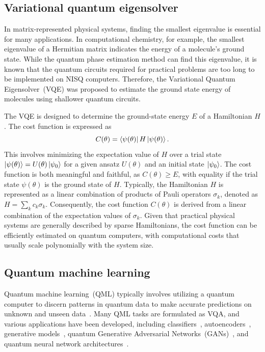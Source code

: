 \documentclass[12pt,dvipdfmx,twoside,openright]{report}
\begin{document}
\subsection{Variational quantum eigensolver}
In matrix-represented physical systems, finding the smallest eigenvalue is essential for many applications. 
In computational chemistry, for example, the smallest eigenvalue of a Hermitian matrix indicates the energy of a molecule's ground state. 
While the quantum phase estimation method can find this eigenvalue, it is known that the quantum circuits required for practical problems are too long to be implemented on NISQ computers.
Therefore, the Variational Quantum Eigensolver~(VQE) was proposed to estimate the ground state energy of molecules using shallower quantum circuits.

The VQE is designed to determine the ground-state energy $E$ of a Hamiltonian $H$.
The cost function is expressed as 
\begin{equation}
    C(\theta)=\bra{\psi(\theta)}H\ket{\psi(\theta)}.
\end{equation}
This involves minimizing the expectation value of $H$ over a trial state $\ket{\psi(\theta)}=U(\theta)\ket{\psi_0}$ for a given ansatz $U(\theta)$ and an initial state $\ket{\psi_0}$.
The cost function is both meaningful and faithful, as $C(\theta)\ge E$, with equality if the trial state $\psi(\theta)$ is the ground state of $H$. 
Typically, the Hamiltonian $H$ is represented as a linear combination of products of Pauli operators $\sigma_k$, denoted as $H=\sum_k c_k \sigma_k$.
Consequently, the cost function $C(\theta)$ is derived from a linear combination of the expectation values of $\sigma_k$. 
Given that practical physical systems are generally described by sparse Hamiltonians, the cost function can be efficiently estimated on quantum computers, with computational costs that usually scale polynomially with the system size.



\subsection{Quantum machine learning}
Quantum machine learning~(QML) typically involves utilizing a quantum computer to discern patterns in quantum data to make accurate predictions on unknown and unseen data~\cite{qml0}. 
Many QML tasks are formulated as VQA, and various applications have been developed, including classifiers~\cite{qml1,qml2}, autoencoders~\cite{q-autoencoder}, generative models~\cite{q-generative,born-machine}, quantum Generative Adversarial Networks~(GANs)~\cite{q-gan}, and quantum neural network architectures~\cite{q-nn}.
\end{document}
